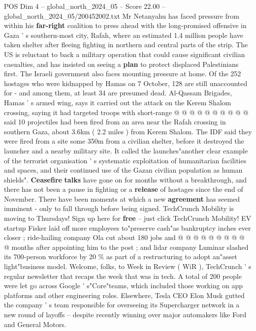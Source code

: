 \begin{textsample}{POS Dim 4 – global\_north\_2024\_05 – Score 22.00 – global\_north\_2024\_05/200452002.txt}
Mr Netanyahu has faced pressure from within his \textbf{far-right} coalition to press ahead with the long-promised offensive in Gaza ' s southern-most city, Rafah, where an estimated 1.4 million people have taken shelter after fleeing fighting in northern and central parts of the strip.
The US is reluctant to back a military operation that could cause significant civilian casualties, and has insisted on seeing a \textbf{plan} to protect displaced Palestinians first.
The Israeli government also faces mounting pressure at home.
Of the 252 hostages who were kidnapped by Hamas on 7 October, 128 are still unaccounted for - and among them, at least 34 are presumed dead.
Al-Qassam Brigades, Hamas ' s armed wing, says it carried out the attack on the Kerem Shalom crossing, saying it had targeted troops with short-range @ @ @ @ @ @ @ @ @ @ said 10 projectiles had been fired from an area near the Rafah crossing in southern Gaza, about 3.6km ( 2.2 miles ) from Kerem Shalom.
The IDF said they were fired from a site some 350m from a civilian shelter, before it destroyed the launcher and a nearby military site.
It called the launches"another clear example of the terrorist organisation ' s systematic exploitation of humanitarian facilities and spaces, and their continued use of the Gazan civilian population as human shields". \textbf{Ceasefire} \textbf{talks} have gone on for months without a breakthrough, and there has not been a pause in fighting or a \textbf{release} of hostages since the end of November.
There have been moments at which a new \textbf{agreement} has seemed imminent - only to fall through before being signed.
TechCrunch Mobility is moving to Thursdays!
Sign up here for \textbf{free} -- just click TechCrunch Mobility!
EV startup Fisker laid off more employees to"preserve cash"as bankruptcy inches ever closer ; ride-hailing company Ola cut about 180 jobs and @ @ @ @ @ @ @ @ @ @ months after appointing him to the post ; and lidar company Luminar slashed its 700-person workforce by 20 \% as part of a restructuring to adopt an"asset light"business model.
Welcome, folks, to Week in Review ( WiR ), TechCrunch ' s regular newsletter that recaps the week that was in tech.
A total of 200 people were let go across Google ' s"Core"teams, which included those working on app platforms and other engineering roles.
Elsewhere, Tesla CEO Elon Musk gutted the company ' s team responsible for overseeing its Supercharger network in a new round of layoffs -- despite recently winning over major automakers like Ford and General Motors.

\end{textsample}
